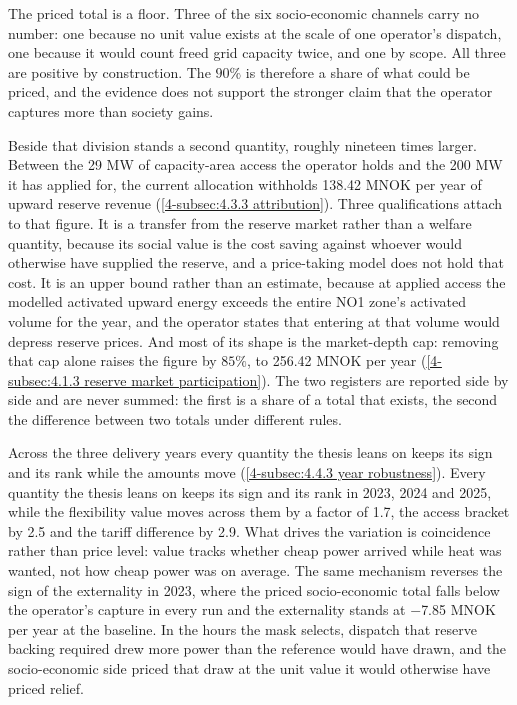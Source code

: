 The priced total is a floor. Three of the six socio-economic channels carry no number: one because no unit value exists at the scale of one operator's dispatch, one because it would count freed grid capacity twice, and one by scope. All three are positive by construction. The $90\%$ is therefore a share of what could be priced, and the evidence does not support the stronger claim that the operator captures more than society gains.

Beside that division stands a second quantity, roughly nineteen times larger. Between the 29 MW of capacity-area access the operator holds and the 200 MW it has applied for, the current allocation withholds 138.42 MNOK per year of upward reserve revenue (\autoref{4-subsec:4.3.3 attribution}). Three qualifications attach to that figure. It is a transfer from the reserve market rather than a welfare quantity, because its social value is the cost saving against whoever would otherwise have supplied the reserve, and a price-taking model does not hold that cost. It is an upper bound rather than an estimate, because at applied access the modelled activated upward energy exceeds the entire NO1 zone's activated volume for the year, and the operator states that entering at that volume would depress reserve prices. And most of its shape is the market-depth cap: removing that cap alone raises the figure by $85\%$, to 256.42 MNOK per year (\autoref{4-subsec:4.1.3 reserve market participation}). The two registers are reported side by side and are never summed: the first is a share of a total that exists, the second the difference between two totals under different rules.

Across the three delivery years every quantity the thesis leans on keeps its sign and its rank while the amounts move (\autoref{4-subsec:4.4.3 year robustness}). Every quantity the thesis leans on keeps its sign and its rank in 2023, 2024 and 2025, while the flexibility value moves across them by a factor of 1.7, the access bracket by 2.5 and the tariff difference by 2.9. What drives the variation is coincidence rather than price level: value tracks whether cheap power arrived while heat was wanted, not how cheap power was on average. The same mechanism reverses the sign of the externality in 2023, where the priced socio-economic total falls below the operator's capture in every run and the externality stands at $-$7.85 MNOK per year at the baseline. In the hours the mask selects, dispatch that reserve backing required drew more power than the reference would have drawn, and the socio-economic side priced that draw at the unit value it would otherwise have priced relief.

